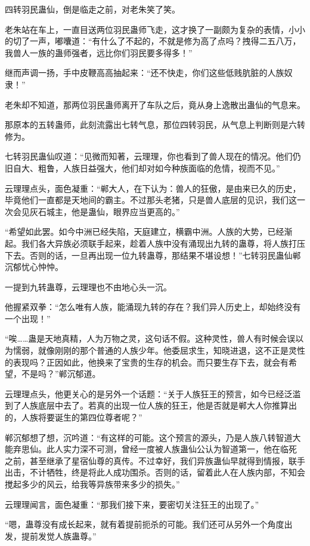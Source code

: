 \begin{this_body}
四转羽民蛊仙，倒是临走之前，对老朱笑了笑。

老朱站在车上，一直目送两位羽民蛊师飞走，这才换了一副颇为复杂的表情，小小的切了一声，嘟囔道：“有什么了不起的，不就是修为高了点吗？拽得二五八万，我兽人一族的蛊师强者，远比你们羽民要多得多！”

继而声调一扬，手中皮鞭高高抽起来：“还不快走，你们这些低贱肮脏的人族奴隶！”

老朱却不知道，那两位羽民蛊师离开了车队之后，竟从身上逸散出蛊仙的气息来。

那原本的五转蛊师，此刻流露出七转气息，那位四转羽民，从气息上判断则是六转修为。

七转羽民蛊仙叹道：“见微而知著，云理理，你也看到了兽人现在的情况。他们仍旧自大、粗鲁，人族日益强大，他们却对如今种族面临的危情，视而不见。”

云理理点头，面色凝重：“郸大人，在下认为：兽人的狂傲，是由来已久的历史，毕竟他们一直都是天地间的霸主。不过那头老猪，只是兽人底层的见识，我们这一次会见灰石城主，他是蛊仙，眼界应当更高的。”

“希望如此罢。如今中洲已经失陷，天庭建立，横霸中洲。人族的大势，已经渐起。我们各大异族必须联手起来，趁着人族中没有涌现出九转的蛊尊，将人族打压下去。否则的话，一旦再出现一位九转蛊尊，那结果不堪设想！”七转羽民蛊仙郸沉郁忧心忡忡。

一提到九转蛊尊，云理理也不由地心头一沉。

他握紧双拳：“怎么唯有人族，能涌现九转的存在？我们异人历史上，却始终没有一个出现！”

“唉……蛊是天地真精，人为万物之灵，这句话不假。这种灵性，兽人有时候会误以为懦弱，就像刚刚的那个普通的人族少年。他委屈求生，知晓进退，这不正是灵性的表现吗？正因如此，他换来了宝贵的生存的机会。而只要生存下去，就会有希望，不是吗？”郸沉郁道。

云理理点头，他更关心的是另外一个话题：“关于人族狂王的预言，如今已经泛滥到了人族底层中去了。若真的出现一位人族的狂王，他是否就是郸大人你推算出的，人族将要诞生的第四位尊者呢？”

郸沉郁想了想，沉吟道：“有这样的可能。这个预言的源头，乃是人族八转智道大能弃思仙。此人实力深不可测，曾经一度被人族蛊仙公认为智道第一，他在临死 之前，甚至继承了星宿仙尊的真传。不过幸好，我们异族蛊仙早就得到情报，联手出击，不计牺牲，终是将此人成功围杀。否则的话，留着此人在人族内部，不知会 搅起多少的风云，给我等异族带来多少的损失。”

云理理闻言，面色凝重：“那我们接下来，要密切关注狂王的出现了。”

“嗯，蛊尊没有成长起来，就有着提前扼杀的可能。我们还可从另外一个角度出发，提前发觉人族蛊尊。”


\end{this_body}
